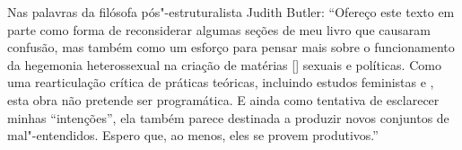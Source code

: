 Nas palavras da filósofa pós"-estruturalista Judith Butler: “Ofereço este texto em parte como forma de reconsiderar algumas seções de meu livro {} que causaram confusão, mas também como um esforço para pensar mais sobre o funcionamento da hegemonia heterossexual na criação de matérias [{}] sexuais e políticas. Como uma rearticulação crítica de práticas teóricas, incluindo estudos feministas e {}, esta obra não pretende ser programática. E ainda como tentativa de esclarecer minhas “intenções”, ela também parece destinada a produzir novos conjuntos de mal"-entendidos. Espero que, ao menos, eles se provem produtivos.”


\vfill

\hspace*{-.4cm}\begin{minipage}[c]{1\linewidth}
\small{
{}}
\end{minipage}

\pagebreak

\vspace*{1.5cm}


\bigskip

\hfill{}

\bigskip
\bigskip
\bigskip


